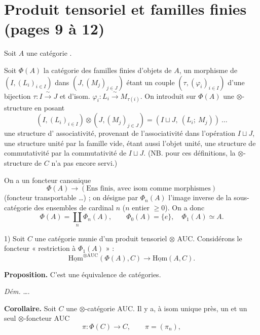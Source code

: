\documentclass[11pt,a4paper]{article}
\begin{document}
\section*{Produit tensoriel et familles finies (pages 9 à 12)}

Soit $A$ une \struck{$\otimes$-}catégorie .

Soit $\Phi(A)$ la catégorie des familles finies d'objets de $A$, un
morphisme de $(I, (L_i)_{i \in I})$ dans $(J, (M_j)_{j \in J})$ étant un
couple $(\tau, (\varphi_i)_{i \in I})$ d'une bijection
$\tau : I \xrightarrow{\ \sim\ } J$ et d'isom.
$\varphi_i : L_i \xrightarrow{\ \sim\ } M_{\tau(i)}$. On introduit sur
$\Phi(A)$ une $\otimes$-structure en posant
\[
(I, (L_i)_{i\in I}) \otimes (J, (M_j)_{j\in J})
= (I \sqcup J,\ (L_i;\ M_j)) \ \ldots
\]
une structure d' associativité, provenant de
l'associativité dans l'opération $I \sqcup J$, une structure unité par la
famille vide, étant aussi l'objet unité, une structure de commutativité par
la commutativité de $I \sqcup J$. (NB. pour ces définitions, la
$\otimes$-structure de $C$ n'a pas encore servi.)


On a un foncteur canonique
\[
\Phi(A) \longrightarrow (\text{Ens finis, avec isom comme morphismes})
\]
(foncteur transportable …) ; on désigne par $\Phi_n(A)$ l'image inverse de
la sous-catégorie des ensembles de cardinal $n$ ($n$ entier $\geq 0$). On a
donc
\[
\Phi(A) = \coprod_n \Phi_n(A),
\qquad \Phi_0(A) = \{e\}, \quad \Phi_1(A) \simeq A.
\]

1) Soit $C$ une catégorie munie d'un produit tensoriel $\otimes$ AUC.
Considérons le foncteur « restriction à $\Phi_1(A)$ » :
\[
\underline{\mathrm{Hom}}^{\otimes \mathrm{AUC}}(\Phi(A), C)
\longrightarrow \underline{\mathrm{Hom}}(A, C).
\]

\textbf{Proposition.} C'est une équivalence de catégories.

\emph{Dém.} ….

\textbf{Corollaire.} Soit $C$ une $\otimes$-catégorie AUC. Il y a, à isom
unique près, un et un seul $\otimes$-foncteur AUC
\[
\pi : \Phi(C) \longrightarrow C, \qquad \pi = (\pi_n),
\]
\end{document}
